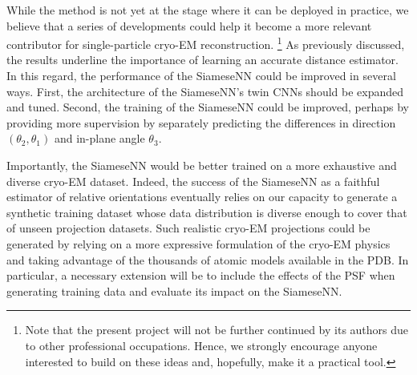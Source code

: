 While the method is not yet at the stage where it can be deployed in practice, we believe that a series of developments could help it become a more relevant contributor for single-particle cryo-EM reconstruction.%
\footnote{Note that the present project will not be further continued by its authors due to other professional occupations. Hence, we strongly encourage anyone interested to build on these ideas and, hopefully, make it a practical tool.}
As previously discussed, the results underline the importance of learning an accurate distance estimator. %
In this regard, the performance of the SiameseNN could be improved in several ways.
First, the architecture of the SiameseNN's twin CNNs should be expanded and tuned.
Second, the training of the SiameseNN could be improved, perhaps by providing more supervision by separately predicting the differences in direction $(\theta_2,\theta_1)$ and in-plane angle $\theta_3$.

Importantly, the SiameseNN would be better trained on a more exhaustive and diverse cryo-EM dataset.
Indeed, the success of the SiameseNN as a faithful estimator of relative orientations eventually relies on our capacity to generate a synthetic training dataset whose data distribution is diverse enough to cover that of unseen projection datasets.
Such realistic cryo-EM projections could be generated by relying on a more expressive formulation of the cryo-EM physics and taking advantage of the thousands of atomic models available in the PDB\@.
In particular, a necessary extension will be to include the effects of the PSF when generating training data and evaluate its impact on the SiameseNN\@. %

